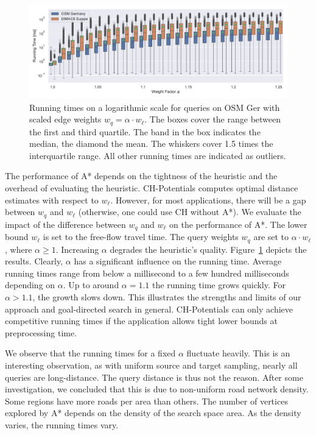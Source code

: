 \documentclass[manuscript]{acmart}
\begin{document}
\begin{figure}
\centering
\includegraphics[width=\linewidth]{fig/scaled_weights.pdf}
\caption{
Running times on a logarithmic scale for queries on OSM Ger with scaled edge weights $w_q = \alpha \cdot w_\ell$.
The boxes cover the range between the first and third quartile.
The band in the box indicates the median, the diamond the mean.
The whiskers cover 1.5 times the interquartile range.
All other running times are indicated as outliers.
}\label{fig:scaled_weights}
\end{figure}

The performance of A* depends on the tightness of the heuristic and the overhead of evaluating the heuristic.
CH-Potentials computes optimal distance estimates with respect to $w_\ell$.
However, for most applications, there will be a gap between $w_q$ and $w_\ell$ (otherwise, one could use CH without A*).
We evaluate the impact of the difference between $w_q$ and $w_\ell$ on the performance of A*.
The lower bound $w_\ell$ is set to the free-flow travel time.
The query weights $w_q$ are set to $\alpha \cdot w_\ell$, where $\alpha\ge 1$.
Increasing $\alpha$ degrades the heuristic's quality.
Figure~\ref{fig:scaled_weights} depicts the results.
Clearly, $\alpha$ has a significant influence on the running time.
Average running times range from below a millisecond to a few hundred milliseconds depending on $\alpha$.
Up to around $\alpha = 1.1$ the running time grows quickly.
For $\alpha > 1.1$, the growth slows down.
This illustrates the strengths and limits of our approach and goal-directed search in general.
CH-Potentials can only achieve competitive running times if the application allows tight lower bounds at preprocessing time.

We observe that the running times for a fixed $\alpha$ fluctuate heavily.
This is an interesting observation, as with uniform source and target sampling, nearly all queries are long-distance.
The query distance is thus not the reason.
After some investigation, we concluded that this is due to non-uniform road network density.
Some regions have more roads per area than others.
The number of vertices explored by A* depends on the density of the search space area.
As the density varies, the running times vary.
\end{document}
